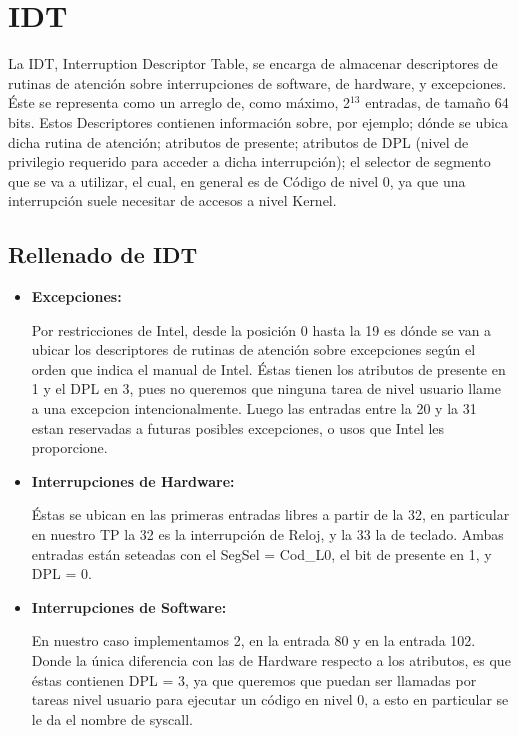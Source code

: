 \section{IDT}
\label{subsec:IDT}
\par{La IDT, Interruption Descriptor Table, se encarga de almacenar descriptores de rutinas de atención sobre interrupciones de software, de hardware, y excepciones. Éste se representa como un arreglo de, como máximo, 2$^{13}$ entradas, de tamaño 64 bits. Estos Descriptores contienen información sobre, por ejemplo; dónde se ubica dicha rutina de atención; atributos de presente; atributos de DPL (nivel de privilegio requerido para acceder a dicha interrupción); el selector de segmento que se va a utilizar, el cual, en general es de Código de nivel 0, ya que una interrupción suele necesitar de accesos a nivel Kernel.}

\subsection{Rellenado de IDT}
\begin{itemize}
	\item {\bfseries Excepciones: }
	\par{Por restricciones de Intel, desde la posición 0 hasta la 19 es dónde se van a ubicar los descriptores de rutinas de atención sobre excepciones según el orden que indica el manual de Intel. Éstas tienen los atributos de presente en 1 y el DPL en 3, pues no queremos que ninguna tarea de nivel usuario llame a una excepcion intencionalmente. Luego las entradas entre la 20 y la 31 estan reservadas a futuras posibles excepciones, o usos que Intel les proporcione.}
	
	\item {\bfseries Interrupciones de Hardware: }
	\par{ Éstas se ubican en las primeras entradas libres a partir de la 32, en particular en nuestro TP la 32 es la interrupción de Reloj, y la 33 la de teclado. Ambas entradas están seteadas con el SegSel = Cod\_L0, el bit de presente en 1, y DPL = 0.}
	
	\item {\bfseries Interrupciones de Software: }
	\par{En nuestro caso implementamos 2, en la entrada 80 y en la entrada 102. Donde la única diferencia con las de Hardware respecto a los atributos, es que éstas contienen DPL = 3, ya que queremos que puedan ser llamadas por tareas nivel usuario para ejecutar un código en nivel 0, a esto en particular se le da el nombre de syscall.}

\end{itemize}

